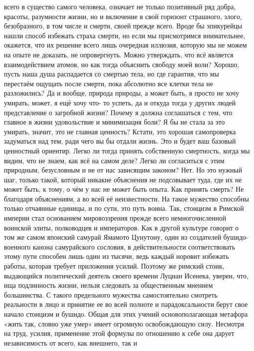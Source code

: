 всего в существо самого человека, означает не только позитивный ряд добра,
красоты, разумности жизни, но и включение в свой горизонт страшного, злого,
безобразного, в том числе и смерти, своей прежде всего. Вроде бы эпикурейцы
нашли способ избежать страха смерти, но если мы присмотримся внимательнее,
окажется, что их решение всего лишь очередная иллюзия, которую мы не можем на
опыте не доказать, не опровергнуть. Можно утверждать, что всё является
взаимодействием атомов, но как тогда объяснить свободу моей воли? Хорошо, пусть
наша душа распадается со смертью тела, но где гарантия, что мы перестаём ощущать
после смерти, пока абсолютно все клетки тела не разложились? Да и вообще,
природа природы, а может быть, я просто не хочу умирать, может, я ещё хочу что-
то успеть, да и откуда тогда у других людей представление о загробной жизни?
Почему я должна соглашаться с тем, что главное в жизни удовольствие и
минимизация боли? Я бы не стала за это умирать, значит, это не главная ценность?
Кстати, это хорошая самопроверка задуматься над тем, ради чего вы бы отдали
жизнь. Это и будет ваш базовый ценностный ориентир. Легко ли тогда принять
собственную смертность, когда мы видим, что не знаем, как всё на самом деле?
Легко ли согласиться с этим природным, безусловным и не от нас зависящим
законом? Нет. Но это нужный шаг, только такой, который никакие объяснения не
подсовывает туда, где их не может быть, к тому, о чём у нас не может быть опыта.
Как принять смерть? Не благодаря объяснениям, а во всей её неизвестности. На
такое мужество способны только отчаянные единицы, и по сути, это путь воина.
Так, стоицизм в Римской империи стал основанием мировоззрения прежде всего
немногочисленной воинской элиты, полководцев и императоров. Как в другой
культуре говорит о том же самом японский самурай Ямамото Цунутону, один из
создателей бушидо-военного канона самурайского сословия, в действительности
соответствовать этому пути способен лишь один из тысячи, ведь каждый норовит
избежать работы, которая требует приложения усилий. Поэтому же римский стоик,
выдающийся политический деятель своего времени Луциан Исенека, уверен, что, ища
подлинность жизни, нельзя следовать за общественным мнением большинства. С
такого предельного мужества самостоятельно смотреть реальности в лицо и принятие
ее во всей полноте и парадоксальности берут свое начало стоицизм и бушидо. Общая
для этих учений основополагающая метафора «жить так, словно уже умер» имеет
огромную освобождающую силу. Несмотря на труд, усилия, применение этой формулы
по отношению к себе она дарует независимость от всего, как внешнего, так и
